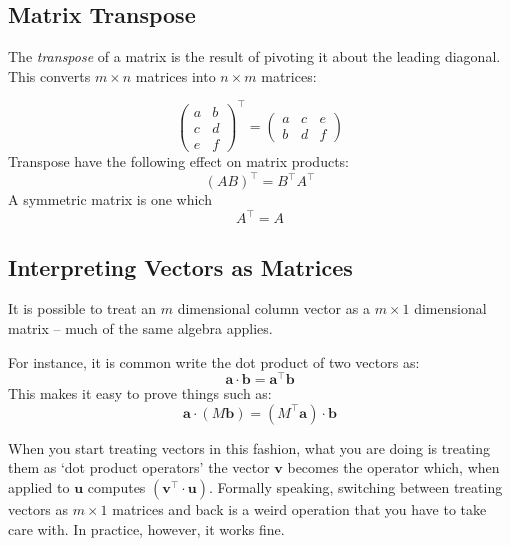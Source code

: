 \documentclass[a4paper,openany,11pt]{book}
\renewcommand\vec[1]{\boldsymbol{\mathbf{#1}}}
\begin{document}
				\subsection{Matrix Transpose}
					The \textit{transpose} of a matrix is the result of pivoting it about the leading diagonal. This converts $m\times n$ matrices into $n \times m$ matrices:

					\begin{equation}
						\begin{pmatrix}
							a & b \\  c & d
							\\
							e & f
						\end{pmatrix}^\intercal = \begin{pmatrix}
							a & c & e \\ b & d & f
						\end{pmatrix}
					\end{equation}
					Transpose have the following effect on matrix products:
					\begin{equation}
						(AB)^\intercal = B^\intercal A^\intercal
					\end{equation}
					A symmetric matrix is one which 
					\begin{equation}
						A^\intercal = A
					\end{equation}
				
				\subsection{Interpreting Vectors as Matrices}

					It is possible to treat an $m$ dimensional column vector as a $m \times 1$ dimensional matrix -- much of the same algebra applies. 
					
					

					For instance, it is common write the dot product of two vectors as:
					$$\vec{a} \cdot \vec{b} = \vec{a}^\intercal \vec{b}$$
					This makes it easy to prove things such as:
					$$ \vec{a} \cdot \left(M \vec{b}\right) = \left(M^\intercal \vec{a} \right) \cdot \vec{b}$$
					
					When you start treating vectors in this fashion, what you are doing is treating them as `dot product operators' the vector $\vec{v}$ becomes the operator which, when applied to $\vec{u}$ computes $(\vec{v}^\intercal \cdot \vec{u})$. Formally speaking, switching between treating vectors as $m \times 1$ matrices and back is a weird operation that you have to take care with. In practice, however, it works fine. 
\end{document}
